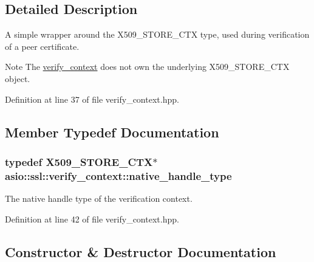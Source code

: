 \subsection{Detailed Description}
A simple wrapper around the X509\+\_\+\+S\+T\+O\+R\+E\+\_\+\+C\+T\+X type, used during verification of a peer certificate. \begin{DoxyNote}{Note}
The \hyperlink{classasio_1_1ssl_1_1verify__context}{verify\+\_\+context} does not own the underlying X509\+\_\+\+S\+T\+O\+R\+E\+\_\+\+C\+T\+X object. 
\end{DoxyNote}


Definition at line 37 of file verify\+\_\+context.\+hpp.



\subsection{Member Typedef Documentation}
\hypertarget{classasio_1_1ssl_1_1verify__context_a73956909dd38aaf2e244fe2df73e13ce}{}
\subsubsection[{native\+\_\+handle\+\_\+type}]{\setlength{\rightskip}{0pt plus 5cm}typedef X509\+\_\+\+S\+T\+O\+R\+E\+\_\+\+C\+T\+X$\ast$ {\bf asio\+::ssl\+::verify\+\_\+context\+::native\+\_\+handle\+\_\+type}}\label{classasio_1_1ssl_1_1verify__context_a73956909dd38aaf2e244fe2df73e13ce}


The native handle type of the verification context. 



Definition at line 42 of file verify\+\_\+context.\+hpp.



\subsection{Constructor \& Destructor Documentation}
\hypertarget{classasio_1_1ssl_1_1verify__context_a9730cba171b03605c833b0bdf855b155}{}
